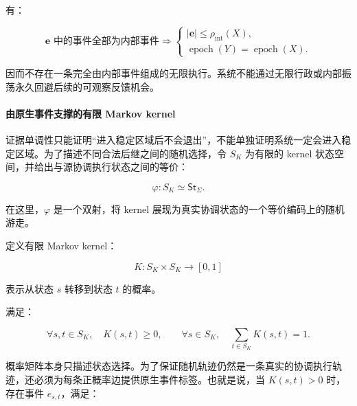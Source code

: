   有：

  \begin{equation}
    \boxed{
      \mathbf e\text{ 中的事件全部为内部事件}
      \Longrightarrow
      \begin{cases}
        |\mathbf e|\le \rho_{\mathrm{int}}(X),\\
        \operatorname{epoch}(Y)=\operatorname{epoch}(X).
      \end{cases}
    }
    \label{eq:feedback-internal-path-bound}
  \end{equation}

  因而不存在一条完全由内部事件组成的无限执行。系统不能通过无限行政或内部振荡永久回避后续的可观察反馈机会。

  \paragraph{由原生事件支撑的有限 Markov kernel}

  证据单调性只能证明“进入稳定区域后不会退出”，不能单独证明系统一定会进入稳定区域。为了描述不同合法后继之间的随机选择，令 $S_K$ 为有限的 kernel 状态空间，并给出与源协调执行状态之间的等价：

  \begin{equation}
    \boxed{
      \varphi:
      S_K
      \simeq
      \mathsf{St}_{\Sigma}.
    }
    \label{eq:feedback-kernel-state-equivalence}
  \end{equation}

  在这里，$\varphi$ 是一个双射，将 kernel 展现为真实协调状态的一个等价编码上的随机游走。

  定义有限 Markov kernel：

  \begin{equation}
    \boxed{
      K:
      S_K\times S_K
      \longrightarrow
      [0,1]
    }
    \label{eq:feedback-native-markov-kernel}
  \end{equation}

  表示从状态 $s$ 转移到状态 $t$ 的概率。

  满足：

  \begin{equation}
    \boxed{
      \forall s,t\in S_K,\quad K(s,t)\ge 0,
      \qquad
      \forall s\in S_K,\quad
      \sum_{t\in S_K}K(s,t)=1.
    }
    \label{eq:feedback-kernel-probability-laws}
  \end{equation}

  概率矩阵本身只描述状态选择。为了保证随机轨迹仍然是一条真实的协调执行轨迹，还必须为每条正概率边提供原生事件标签。也就是说，当 $K(s,t)>0$ 时，存在事件 $e_{s,t}$，满足：

